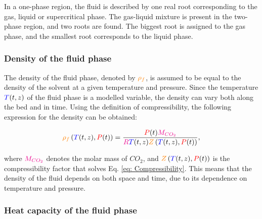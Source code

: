 \documentclass[../Article_Model_Parameters.tex]{subfiles}
\begin{document}
	In a one-phase region, the fluid is described by one real root corresponding to the gas, liquid or supercritical phase. The gas-liquid mixture is present in the two-phase region, and two roots are found. The biggest root is assigned to the gas phase, and the smallest root corresponds to the liquid phase.
	
	\subsubsection{Density of the fluid phase} \label{subsubsec: Fluid density}
	
	The density of the fluid phase, denoted by ${\color{orange}\rho_f}$, is assumed to be equal to the density of the solvent at a given temperature and pressure. Since the temperature ${\color{blue}T}(t,z)$ of the fluid phase is a modelled variable, the density can vary both along the bed and in time. Using the definition of compressibility, the following expression for the density can be obtained:
	
	{\footnotesize
		\begin{equation} \label{eq: Density}
			{\color{orange}\rho_f} \left({\color{blue}T}(t,z),{\color{red}P}(t) \right) = \frac{{\color{red}P}(t) {\color{magenta}M_{CO_2}}}{{\color{magenta}R}{\color{blue}T}(t,z){\color{orange}Z}\left({\color{blue}T}(t,z),{\color{red}P}(t) \right)},
	\end{equation}}
	
	where ${\color{magenta}M_{CO_2}}$ denotes the molar mass of $CO_2$, and ${\color{orange}Z}\left({\color{blue}T}(t,z), {\color{red}P}(t)\right)$ is the compressibility factor that solves Eq. \eqref{eq: Compressibility}. This means that the density of the fluid depends on both space and time, due to its dependence on temperature and pressure.
	
	\subsubsection{Heat capacity of the fluid phase} \label{subsubsec: Fluid heat capacity}
	
\end{document}
